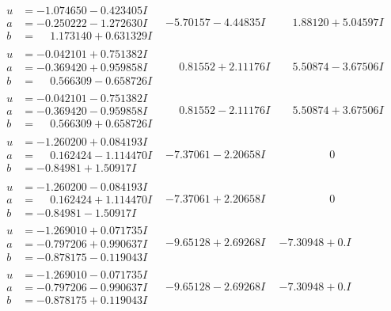\documentclass[1p]{elsarticle_modified}
\theoremstyle{definition}
\begin{document}
$$\begin{array}{c|c|c}
\begin{aligned}
u &= -1.074650 - 0.423405 I \\
a &= -0.250222 - 1.272630 I \\
b &= \phantom{-}1.173140 + 0.631329 I\end{aligned}
 & -5.70157 - 4.44835 I & \phantom{-}1.88120 + 5.04597 I \\ \hline\begin{aligned}
u &= -0.042101 + 0.751382 I \\
a &= -0.369420 + 0.959858 I \\
b &= \phantom{-}0.566309 - 0.658726 I\end{aligned}
 & \phantom{-}0.81552 + 2.11176 I & \phantom{-}5.50874 - 3.67506 I \\ \hline\begin{aligned}
u &= -0.042101 - 0.751382 I \\
a &= -0.369420 - 0.959858 I \\
b &= \phantom{-}0.566309 + 0.658726 I\end{aligned}
 & \phantom{-}0.81552 - 2.11176 I & \phantom{-}5.50874 + 3.67506 I \\ \hline\begin{aligned}
u &= -1.260200 + 0.084193 I \\
a &= \phantom{-}0.162424 - 1.114470 I \\
b &= -0.84981 + 1.50917 I\end{aligned}
 & -7.37061 - 2.20658 I & \phantom{-0.000000 } 0 \\ \hline\begin{aligned}
u &= -1.260200 - 0.084193 I \\
a &= \phantom{-}0.162424 + 1.114470 I \\
b &= -0.84981 - 1.50917 I\end{aligned}
 & -7.37061 + 2.20658 I & \phantom{-0.000000 } 0 \\ \hline\begin{aligned}
u &= -1.269010 + 0.071735 I \\
a &= -0.797206 + 0.990637 I \\
b &= -0.878175 - 0.119043 I\end{aligned}
 & -9.65128 + 2.69268 I & -7.30948 + 0. I\phantom{ +0.000000I} \\ \hline\begin{aligned}
u &= -1.269010 - 0.071735 I \\
a &= -0.797206 - 0.990637 I \\
b &= -0.878175 + 0.119043 I\end{aligned}
 & -9.65128 - 2.69268 I & -7.30948 + 0. I\phantom{ +0.000000I} \\ \hline\begin{aligned}

\end{aligned}
\end{array}$$
\end{document}
